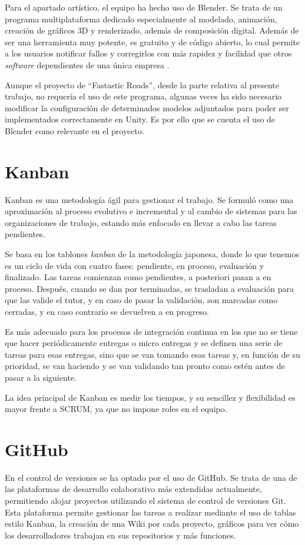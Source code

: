 Para el apartado artístico, el equipo ha hecho uso de Blender. Se trata de un programa multiplataforma dedicado especialmente al modelado, animación, creación de gráficos 3D y renderizado, además de composición digital. Además de ser una herramienta muy potente, es gratuito y de código abierto, lo cual permite a los usuarios notificar fallos y corregirlos con más rapidez y facilidad que otros \textit{software} dependientes de una única empresa \cite{blender}.

Aunque el proyecto de ``Fastastic Roads'', desde la parte relativa al presente trabajo, no requería el uso de este programa, algunas veces ha sido necesario modificar la configuración de determinados modelos adjuntados para poder ser implementados correctamente en Unity. Es por ello que se cuenta el uso de Blender como relevante en el proyecto.

\section{Kanban}

Kanban es una metodología ágil para gestionar el trabajo. Se formuló como una aproximación al proceso evolutivo e incremental y al cambio de sistemas para las organizaciones de trabajo, estando más enfocado en llevar a cabo las tareas pendientes. 

Se basa en los tablones \textit{kanban} de la metodología japonesa, donde lo que tenemos es un ciclo de vida con cuatro fases: pendiente, en proceso, evaluación y finalizado. Las tareas comienzan como pendientes, a posteriori pasan a en proceso. Después, cuando se dan por terminadas, se trasladan a evaluación para que las valide el tutor, y en caso de pasar la validación, son marcadas como cerradas, y en caso contrario se devuelven a en progreso. 

Es más adecuado para los procesos de integración continua en los que no se tiene que hacer periódicamente entregas o micro entregas y se definen una serie de tareas para esas entregas, sino que se van tomando esas tareas y, en función de su prioridad, se van haciendo y se van validando tan pronto como estén antes de pasar a la siguiente. 

La idea principal de Kanban es medir los tiempos, y su sencillez y flexibilidad es mayor frente a SCRUM, ya que no impone roles en el equipo.

\section{GitHub}

En el control de versiones se ha optado por el uso de GitHub. Se trata de una de las plataformas de desarrollo colaborativo más extendidas actualmente, permitiendo alojar proyectos utilizando el sistema de control de versiones Git. Esta plataforma permite gestionar las tareas a realizar mediante el uso de tablas estilo Kanban, la creación de una Wiki por cada proyecto, gráficos para ver cómo los desarrolladores trabajan en sus repositorios y más funciones.